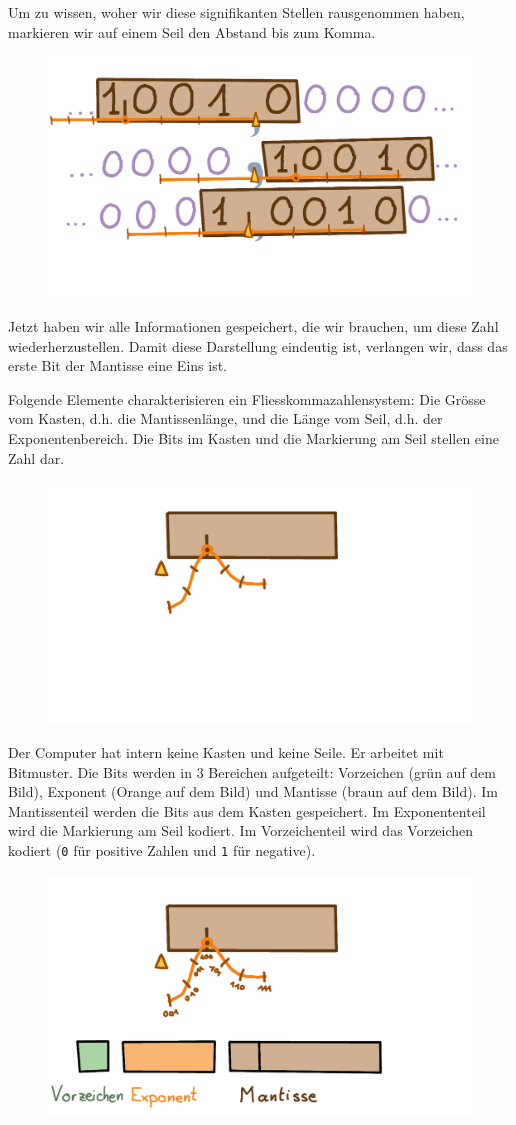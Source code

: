 Um zu wissen, woher wir diese signifikanten Stellen rausgenommen haben, markieren wir auf einem Seil den Abstand bis zum Komma.
\begin{figure}[H]
\centering
\includegraphics[width=0.65\linewidth]{Pictures/KastenMitSeil.png} 
\end{figure}
Jetzt haben wir alle Informationen gespeichert, die wir brauchen, um diese Zahl wiederherzustellen. Damit diese Darstellung eindeutig ist, verlangen wir, dass das erste Bit der Mantisse eine Eins ist.

Folgende Elemente charakterisieren ein Fliesskommazahlensystem: Die Grösse vom Kasten, d.h. die Mantissenlänge, und die Länge vom Seil, d.h. der Exponentenbereich. Die Bits im Kasten und die Markierung am Seil stellen eine Zahl dar.
\begin{figure}[H]
\centering
\includegraphics[width=0.75\linewidth]{Pictures/KastenOhneZahlen.png} 
\end{figure}

Der Computer hat intern keine Kasten und keine Seile. Er arbeitet mit Bitmuster. Die Bits werden in \(3\) Bereichen aufgeteilt: Vorzeichen (grün auf dem Bild), Exponent (Orange auf dem Bild) und Mantisse (braun auf dem Bild). Im Mantissenteil werden die Bits aus dem Kasten gespeichert. Im Exponententeil wird die Markierung am Seil kodiert. Im Vorzeichenteil wird das Vorzeichen kodiert (\texttt{0} für positive Zahlen und \texttt{1} für negative).
\begin{figure}[H]
\centering
\includegraphics[width=0.75\linewidth]{Pictures/KastenMitSpeicher.png} 
\end{figure}


